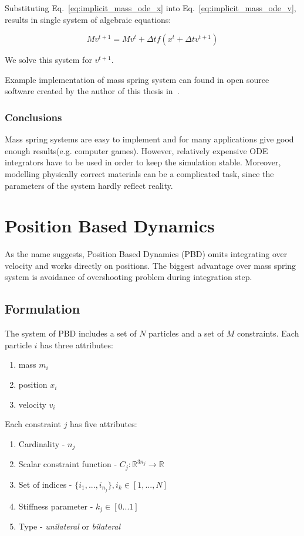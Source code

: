 \documentclass[en]{minipw} %
\begin{document}
Substituting Eq.~\ref{eq:implicit_mass_ode_x} into Eq.~\ref{eq:implicit_mass_ode_v}, results in single system of algebraic equations:

\begin{equation}
M v^{t+1} = M v^{t} + \Delta t f(x^{t} + \Delta t v^{t+1})
\end{equation}

We solve this system for $v^{t+1}$.

Example implementation of mass spring system can found in open source software created by the author of this thesis in~\cite{JC-MassSpring}. 

\subsubsection{Conclusions}
Mass spring systems are easy to implement and for many applications give good enough results(e.g. computer games). However, relatively expensive ODE integrators have to be used in order to keep the simulation stable. Moreover, modelling physically correct materials can be a complicated task, since the parameters of the system hardly reflect reality.

\section{Position Based Dynamics}
As the name suggests, Position Based Dynamics (PBD) omits integrating over velocity and works directly on positions. The biggest advantage over mass spring system is avoidance of overshooting problem during integration step.
\subsection{Formulation}
The system of PBD includes a set of $N$ particles and a set of $M$ constraints. Each particle $i$ has three attributes: 
\begin{enumerate}
\item mass $m_i$
\item position $x_i$
\item velocity $v_i$
\end{enumerate}

Each constraint $j$ has five attributes:

\begin{enumerate}
\item Cardinality - $n_j$
\item Scalar constraint function - $C_j : \mathbb{R}^{3n_j} \rightarrow \mathbb{R}$
\item Set of indices - $\{i_1, ..., i_{n_{j}}\}, i_k \in [1, ..., N]$
\item Stiffness parameter - $k_j \in [0 ... 1]$
\item Type - \textit{unilateral} or \textit{bilateral}
\end{enumerate}
\end{document}
